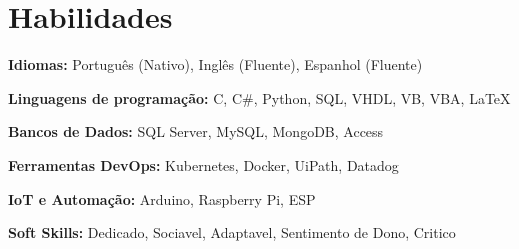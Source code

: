 \section{Habilidades}
	\textbf{Idiomas:} Português (Nativo), Inglês (Fluente), Espanhol (Fluente)

	\textbf{Linguagens de programação:} C, C\#, Python, SQL, VHDL, VB, VBA, LaTeX

	\textbf{Bancos de Dados:} SQL Server, MySQL, MongoDB, Access

	\textbf{Ferramentas DevOps:} Kubernetes, Docker, UiPath, Datadog

	\textbf{IoT e Automação:} Arduino, Raspberry Pi, ESP
	
	\textbf{Soft Skills:} Dedicado, Sociavel, Adaptavel, Sentimento de Dono, Critico